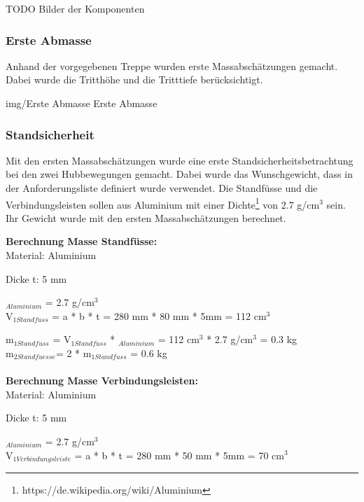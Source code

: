 TODO Bilder der Komponenten

\subsubsection{Erste Abmasse}

Anhand der vorgegebenen Treppe wurden erste Massabschätzungen gemacht. Dabei wurde die Tritthöhe und die Tritttiefe berücksichtigt.

\image
 {img/Erste Abmasse}
 {Erste Abmasse}

\subsubsection{Standsicherheit}

Mit den ersten Massabschätzungen wurde eine erste Standsicherheitsbetrachtung bei den zwei Hubbewegungen gemacht. Dabei wurde das Wunschgewicht, dass in der Anforderungsliste definiert wurde verwendet. Die Standfüsse und die Verbindungsleisten sollen aus Aluminium mit einer Dichte\footnote{https://de.wikipedia.org/wiki/Aluminium} von 2.7 g/cm$^{3}$ sein. Ihr Gewicht wurde mit den ersten Massabschätzungen berechnet.

\newpage

\textbf{Berechnung Masse Standfüsse:}\\

Material: Aluminium

Dicke t: 5 mm

{\rho}$_{Aluminium}$ = 2.7 g/cm$^{3}$\\

V$_{1 Standfuss}$ = a * b * t = 280 mm * 80 mm * 5mm = 112 cm$^{3}$

m$_{1 Standfuss}$ = V$_{1 Standfuss}$ * \rho$_{Aluminium}$ = 112 cm$^{3}$ * 2.7 g/cm$^{3}$ = 0.3 kg\\

m$_{2 Standfuesse}$= 2 * m$_{1 Standfuss}$ = 0.6 kg\\
\\

\textbf{Berechnung Masse Verbindungsleisten:}\\

Material: Aluminium

Dicke t: 5 mm

\rho$_{Aluminium}$ = 2.7 g/cm$^{3}$\\

V$_{1 Verbindungsleiste}$ = a * b * t = 280 mm * 50 mm * 5mm = 70 cm$^{3}$

